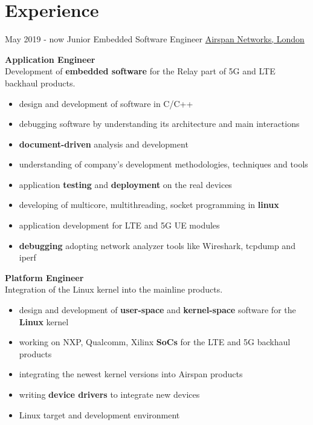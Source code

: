 \documentclass[letterpaper]{twentysecondcv} %
\begin{document}
\makeprofile %


\section{Experience}

\begin{twenty} %
    \twentyitem
    	{May 2019 -}
		{now}
        {Junior Embedded Software Engineer}
        {\href{https://www.airspan.com/}{Airspan Networks, London}}
        {}
        {
            \textbf{Application Engineer}\\
            Development of \textbf{embedded software} for the Relay part of 5G and LTE backhaul products.
            \begin{itemize}
                \item design and development of software in C/C++
                \item debugging software by understanding its architecture and main interactions
                \item \textbf{document-driven} analysis and development
                \item understanding of company's development methodologies, techniques and tools
                \item application \textbf{testing} and \textbf{deployment} on the real devices
                \item developing of multicore, multithreading, socket programming in \textbf{linux}
                \item application development for LTE and 5G UE modules
                \item \textbf{debugging} adopting network analyzer tools like Wireshark, tcpdump and iperf
            \end{itemize}

            \textbf{Platform Engineer}\\
            Integration of the Linux kernel into the mainline products.
            \begin{itemize}
                \item design and development of \textbf{user-space} and \textbf{kernel-space} software for the \textbf{Linux} kernel
                \item working on NXP, Qualcomm, Xilinx \textbf{SoCs} for the LTE and 5G backhaul products
                \item integrating the newest kernel versions into Airspan products
                \item writing \textbf{device drivers} to integrate new devices
                \item Linux target and development environment
            \end{itemize}

}
\end{twenty}
\end{document}
